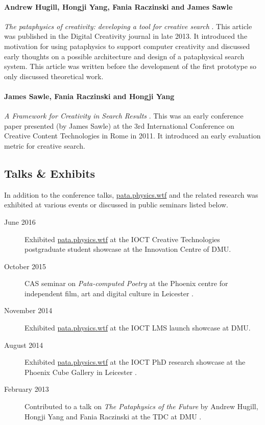 \paragraph{Andrew Hugill, Hongji Yang, Fania Raczinski and James Sawle} \textit{The pataphysics of creativity: developing a tool for creative search} \citeyear{Hugill2013d}. This article was published in the Digital Creativity journal in late 2013. It introduced the motivation for using pataphysics to support computer creativity and discussed early thoughts on a possible architecture and design of a pataphysical search system. This article was written before the development of the first prototype so only discussed theoretical work.

\paragraph{James Sawle, Fania Raczinski and Hongji Yang} \textit{A Framework for Creativity in Search Results} \citeyear{Sawle2011}. This was an early conference paper presented (by James Sawle) at the 3rd International Conference on Creative Content Technologies in Rome in 2011. It introduced an early evaluation metric for creative search.


\subsection{Talks \& Exhibits}
\label{s:talks}

In addition to the conference talks, \url{pata.physics.wtf} and the related research was exhibited at various events or discussed in public seminars listed below.

\begin{description}
  \item[June 2016] Exhibited \url{pata.physics.wtf} at the \ac{IOCT} Creative Technologies postgraduate student showcase at the Innovation Centre of \ac{DMU}.
  \item[October 2015] \ac{CAS} seminar on \textit{Pata-computed Poetry} at the Phoenix centre for independent film, art and digital culture in Leicester \autocite{Clark2015,Clark2015a}.
  \item[November 2014] Exhibited \url{pata.physics.wtf} at the \ac{IOCT} \ac{LMS} launch showcase at \ac{DMU}.
  \item[August 2014] Exhibited \url{pata.physics.wtf} at the \ac{IOCT} PhD research showcase at the Phoenix Cube Gallery in Leicester \autocite{Clark2014}.
  \item[February 2013] Contributed to a talk on \textit{The Pataphysics of the Future} by Andrew Hugill, Hongji Yang and Fania Raczinski at the \ac{TDC} at \ac{DMU} \autocite{Trans2013}.
\end{description}


